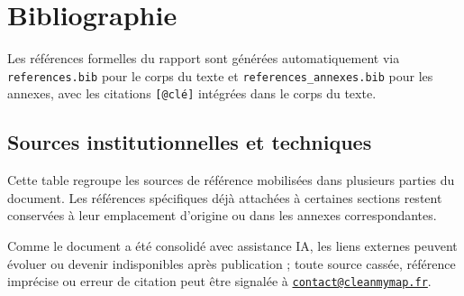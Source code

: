 \documentclass[
  10pt,
  a4paper,
  DIV=11,
  numbers=noendperiod,
  oneside]{scrreprt}
\begin{document}
\newpage{}

\chapter*{Bibliographie}\label{bibliographie}

Les références formelles du rapport sont générées automatiquement via
\texttt{references.bib} pour le corps du texte et
\texttt{references\_annexes.bib} pour les annexes, avec les citations
\texttt{{[}@clé{]}} intégrées dans le corps du texte.

\section{Sources institutionnelles et
techniques}\label{sources-institutionnelles-et-techniques}

Cette table regroupe les sources de référence mobilisées dans plusieurs
parties du document. Les références spécifiques déjà attachées à
certaines sections restent conservées à leur emplacement d'origine ou
dans les annexes correspondantes.

Comme le document a été consolidé avec assistance IA, les liens externes
peuvent évoluer ou devenir indisponibles après publication ; toute
source cassée, référence imprécise ou erreur de citation peut être
signalée à
\href{mailto:contact@cleanmymap.fr}{\nolinkurl{contact@cleanmymap.fr}}.
\end{document}
